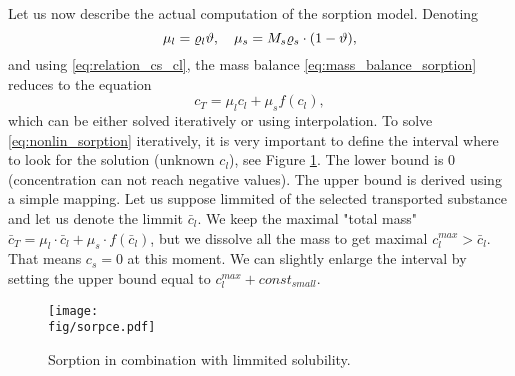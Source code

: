 Let us now describe the actual computation of the sorption model. Denoting
\[ \mu_l = \varrho_l \vartheta, \quad \mu_s = M_s \varrho_s\cdot(1-\vartheta), \]
and using \eqref{eq:relation_cs_cl}, the mass balance \eqref{eq:mass_balance_sorption} reduces to the equation
\begin{equation}
 c_T = \mu_l c_l + \mu_s f(c_l),
 \label{eq:nonlin_sorption}
\end{equation}
which can be either solved iteratively or using interpolation.
To solve \eqref{eq:nonlin_sorption} iteratively, it is very important to define the interval where 
to look for the solution (unknown $c_l$), see Figure \ref{fig:sorpce}. The lower bound is $0$ (concentration can not reach negative values). 
The upper bound is derived using a simple mapping. Let us suppose limmited 
 of the selected transported substance and let us denote the 
limmit $\bar{c}_l$. We keep the maximal "total mass" 
$\bar{c}_T= \mu_l\cdot \bar{c}_l + \mu_s\cdot f(\bar{c}_l)$, but we dissolve all the mass to get 
maximal $c_l^{max} > \bar{c}_l$. That means $c_s = 0$ at this moment. We can slightly enlarge the interval by setting the upper bound equal to 
$c_l^{max} + const_{small}$.

\begin{figure}[ht!]
 \centering
 \texttt{[image: \\fig/sorpce.pdf]}
 \caption{Sorption in combination with limmited solubility.}
 \label{fig:sorpce}
\end{figure}


